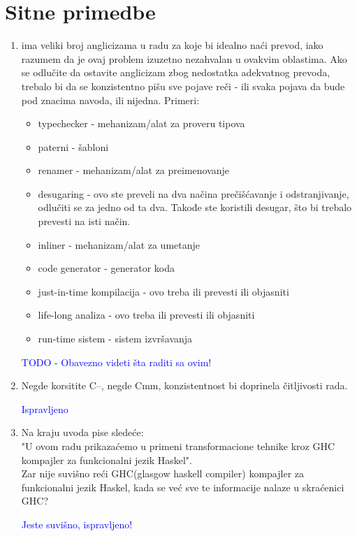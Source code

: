 \documentclass[a4paper]{report}
\newcommand{\odgovor}[1]{\textcolor{blue}{#1}}
\begin{document}
\section{Sitne primedbe}
\begin{enumerate}
	\item ima veliki broj anglicizama u radu za koje bi idealno naći prevod, iako razumem da je ovaj problem izuzetno nezahvalan u ovakvim oblastima. Ako se odlučite da ostavite anglicizam zbog nedostatka adekvatnog prevoda, trebalo bi da se konzistentno pišu sve pojave reči - ili svaka pojava da bude pod znacima navoda, ili nijedna. Primeri:
		\begin{itemize}
			\item typechecker - mehanizam/alat za proveru tipova
			\item paterni - šabloni
			\item renamer - mehanizam/alat za preimenovanje
			\item desugaring - ovo ste preveli na dva načina prečišćavanje i odstranjivanje, odlučiti se za jedno od ta dva. Takođe ste koristili desugar, što bi trebalo prevesti na isti način.
			\item inliner - mehanizam/alat za umetanje
			\item code generator - generator koda
			\item just-in-time kompilacija - ovo treba ili prevesti ili objasniti
			\item life-long analiza - ovo treba ili prevesti ili objasniti
			\item run-time sistem - sistem izvršavanja
		\end{itemize}
	
	\odgovor{TODO - Obavezno videti šta raditi sa ovim!}
	
	\item Negde korsitite C--, negde Cmm, konzistentnost bi doprinela čitljivosti rada.

	\odgovor{Ispravljeno}
	
	\item Na kraju uvoda pise sledeće:\\
	"U ovom radu prikazaćemo u primeni transformacione tehnike kroz GHC
	kompajler za funkcionalni jezik Haskel".\\
	Zar nije suvišno reći GHC(glasgow haskell compiler) kompajler za funkcionalni jezik Haskel, kada se već sve te informacije nalaze u skraćenici GHC?
	
	\odgovor{Jeste suvišno, ispravljeno!}
	

\end{enumerate}
\end{document}
